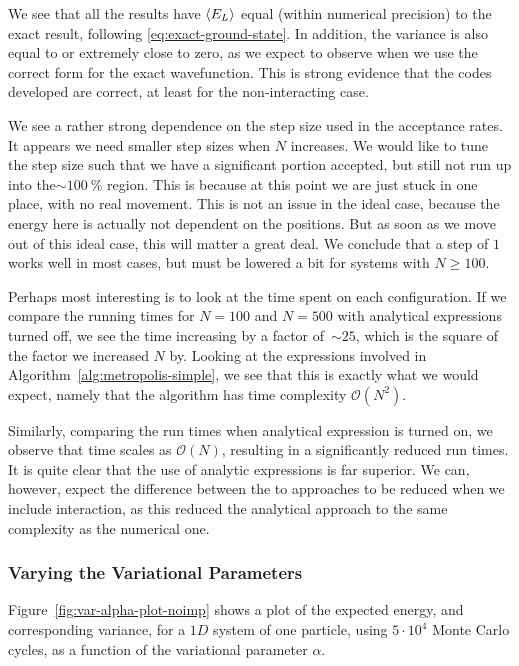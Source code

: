 \documentclass[twocolumn]{article}
\begin{document}
We see that all the results have $\expval{E_L}$
equal (within numerical precision) to the exact result, following
\eqref{eq:exact-ground-state}. In addition, the variance is also equal to
or extremely close to zero, as we expect to observe when we use the correct form
for the exact wavefunction. This is strong evidence that the codes developed are
correct, at least for the non-interacting case.

We see a rather strong dependence on the step size used in the acceptance rates.
It appears we need smaller step sizes when $N$ increases. We would like to tune 
the step size such that we have a significant portion accepted, but still not
run up into the$\sim \SI{100}{\percent}$ region. This is because at this point
we are just stuck in one place, with no real movement. This is not an issue in
the ideal case, because the energy here is actually not dependent on the
positions. But as soon as we move out of this ideal case, this will matter a
great deal. We conclude that a step of $1$ works well in most cases, but must be
lowered a bit for systems with $N \geq 100$.

Perhaps most interesting is to look at the time spent on each configuration. If
we compare the running times for $N=100$ and $N=500$ with analytical expressions
turned off, we see the time increasing by a factor of~$\sim 25$, which is the
square of the factor we increased $N$ by. Looking at the expressions involved in
Algorithm~\ref{alg:metropolis-simple}, we see that this is exactly what we would
expect, namely that the algorithm has time complexity $\mathcal{O}(N^2)$.

Similarly, comparing the run times when analytical expression is turned on, we observe
that time scales as $\mathcal{O}(N)$, resulting in a significantly reduced run
times. It is quite clear that the use of analytic expressions is far superior.
We can, however, expect the difference between the to approaches to be reduced
when we include interaction, as this reduced the analytical approach to the same
complexity as the numerical one.




\subsubsection{Varying the Variational Parameters}

Figure~\ref{fig:var-alpha-plot-noimp} shows a plot of the expected energy, and
corresponding variance, for a $1D$ system of one particle, using $5\cdot 10^4$ Monte
Carlo cycles, as a function of the variational parameter $\alpha$.
\end{document}
